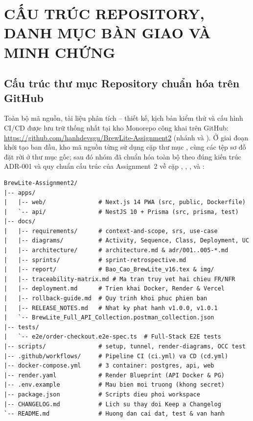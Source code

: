 \documentclass[12pt,a4paper]{report}
\begin{document}
\chapter{CẤU TRÚC REPOSITORY, DANH MỤC BÀN GIAO VÀ MINH CHỨNG}

\section{Cấu trúc thư mục Repository chuẩn hóa trên GitHub}

Toàn bộ mã nguồn, tài liệu phân tích -- thiết kế, kịch bản kiểm thử và cấu hình CI/CD được lưu trữ thống nhất tại kho Monorepo công khai trên GitHub: \url{https://github.com/hanhdevsgu/BrewLite-Assignment2} (nhánh  và ). Ở giai đoạn khởi tạo ban đầu, kho mã nguồn từng sử dụng cặp thư mục ,  cùng các tệp sơ đồ đặt rời ở thư mục gốc; sau đó nhóm đã chuẩn hóa toàn bộ theo đúng kiến trúc ADR-001 và quy chuẩn cấu trúc của Assignment~2 về cặp , , ,  và :

\noindent\begin{minipage}{\linewidth}
\begingroup\singlespacing\footnotesize
\begin{verbatim}
BrewLite-Assignment2/
|-- apps/
|   |-- web/               # Next.js 14 PWA (src, public, Dockerfile)
|   `-- api/               # NestJS 10 + Prisma (src, prisma, test)
|-- docs/
|   |-- requirements/      # context-and-scope, srs, use-case
|   |-- diagrams/          # Activity, Sequence, Class, Deployment, UC
|   |-- architecture/      # architecture.md & adr/001..005-*.md
|   |-- sprints/           # sprint-retrospective.md
|   |-- report/            # Bao_Cao_BrewLite_v16.tex & img/
|   |-- traceability-matrix.md # Ma tran truy vet hai chieu FR/NFR
|   |-- deployment.md      # Trien khai Docker, Render & Vercel
|   |-- rollback-guide.md  # Quy trinh khoi phuc phien ban
|   |-- RELEASE_NOTES.md   # Nhat ky phat hanh v1.0.0, v1.0.1
|   `-- BrewLite_Full_API_Collection.postman_collection.json
|-- tests/
|   `-- e2e/order-checkout.e2e-spec.ts  # Full-Stack E2E tests
|-- scripts/               # setup, tunnel, render-diagrams, OCC test
|-- .github/workflows/     # Pipeline CI (ci.yml) va CD (cd.yml)
|-- docker-compose.yml     # 3 container: postgres, api, web
|-- render.yaml            # Render Blueprint (API Docker & PG)
|-- .env.example           # Mau bien moi truong (khong secret)
|-- package.json           # Scripts dieu phoi workspace
|-- CHANGELOG.md           # Lich su thay doi Keep a Changelog
`-- README.md              # Huong dan cai dat, test & van hanh
\end{verbatim}
\endgroup
\end{minipage}\par\vspace{6pt}
\end{document}
